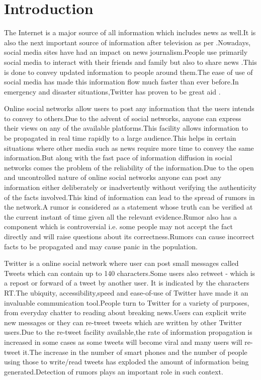 \chapter{Introduction}

The Internet is a major source of all information which includes news as well.It is also the next important source of information after television as per \cite{kohut2008internet}.Nowadays, social media sites have had an impact on news journalism.People use primarily social media to interact with their friends and family but also to share news \cite{java2007we}.This is done to convey updated information to people around them.The ease of use of social media has made this information flow much faster than ever before.In emergency and disaster situations,Twitter has proven to be great aid \cite{vieweg2010microblogged}.
\\
\par
Online social networks allow users to post any information that the users intends to convey to others.Due to the advent of social networks, anyone can express their views on any of the available platforms.This facility allows information to be propagated in real time rapidly to a large audience.This helps in certain situations where other media such as news require more time to convey the same information.But along with the fast pace of information diffusion in social networks comes the problem of the reliability of the information.Due to the open and uncontrolled nature of online social networks anyone can post any information either deliberately or inadvertently without verifying the authenticity of the facts involved.This kind of information can lead to the spread of rumors in the network.A rumor is considered as a statement whose truth can be verified at the current instant of time given all the relevant evidence.Rumor also has a component which is controversial i.e. some people may not accept the fact directly and will raise questions about its correctness.Rumors can cause incorrect facts to be propagated and may cause panic in the population.\\
\par
Twitter is a online social network where user can post small messages called Tweets which can contain up to 140 characters.Some users also retweet - which is a repost or forward of a tweet by another user. It is indicated by the characters RT.The ubiquity, accessibility,speed and ease-of-use of Twitter have made it an invaluable communication tool.People turn to Twitter for a variety of purposes, from everyday chatter to reading about breaking news.Users can explicit write new messages or they can re-tweet tweets which are written by other Twitter users.Due to the re-tweet facility available,the rate of information propagation is increased in some cases as some tweets will become viral and many users will re-tweet it.The increase in the number of smart phones and the number of people using those to write/read tweets has exploded the amount of information being generated.Detection of rumors plays an important role in such context.\\
